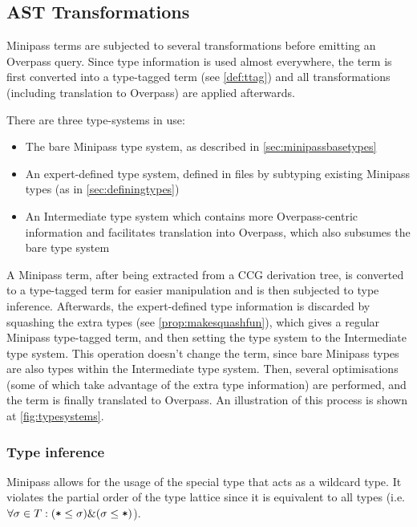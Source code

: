 \documentclass[main.tex]{subfiles}
\begin{document}
\subsection{AST Transformations}
Minipass terms are subjected to several transformations before emitting
an Overpass query. Since type information is used almost everywhere,
the term is first converted into a type-tagged term (see \cref{def:ttag})
and all transformations (including translation to Overpass) are applied
afterwards.

There are three type-systems in use:
\begin{itemize}
    \item The bare Minipass type system, as described in \cref{sec:minipassbasetypes}
    \item An expert-defined type system, defined in  files
        by subtyping existing Minipass types (as in \cref{sec:definingtypes})
    \item An Intermediate type system which contains more Overpass-centric
        information and facilitates translation into Overpass, which
        also subsumes the bare type system
\end{itemize}

A Minipass term, after being extracted from a CCG derivation tree, is converted
to a type-tagged term for easier manipulation and is then subjected to type
inference. Afterwards, the expert-defined type information is discarded
by squashing the extra types (see \cref{prop:makesquashfun}), which gives
a regular Minipass type-tagged term, and then setting the type system to
the Intermediate type system. This operation doesn't change the term, since
bare Minipass types are also types within the Intermediate type system.
Then, several optimisations (some of which take advantage of the extra type
information) are performed, and the term is finally translated to Overpass.
An illustration of this process is shown at \cref{fig:typesystems}.


\subsubsection{Type inference}
\label{sec:typeinf}
Minipass allows for the usage of the special type \code{*} that acts as a
wildcard type. It violates the partial order of the type lattice since it is
equivalent to all types (i.e. $\forall \sigma \in T: (\text{\mbox{\texttt{*}}} \leq \sigma)
\& (\sigma \leq \text{\mbox{\texttt{*}}})$).
\end{document}
